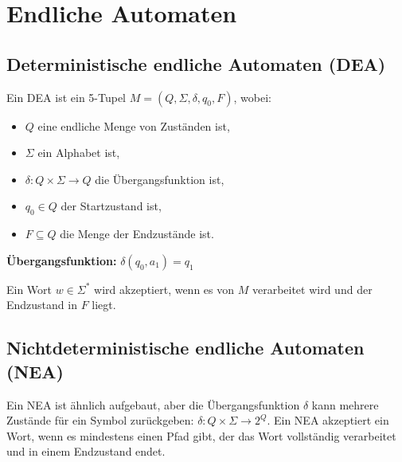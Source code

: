 \documentclass{article}
\begin{document}
\section*{Endliche Automaten}
\begin{minipage}[t]{0.45\textwidth}
    \subsection*{Deterministische endliche Automaten (DEA)}
    Ein DEA ist ein 5-Tupel $M = (Q, \Sigma, \delta, q_0, F)$, wobei:
    \begin{itemize}
        \item $Q$ eine endliche Menge von Zuständen ist,
        \item $\Sigma$ ein Alphabet ist,
        \item $\delta: Q \times \Sigma \to Q$ die Übergangsfunktion ist,
        \item $q_0 \in Q$ der Startzustand ist,
        \item $F \subseteq Q$ die Menge der Endzustände ist.
    \end{itemize}
    \textbf{Übergangsfunktion:} $\delta(q_0, a_1) = q_1$

    Ein Wort $w \in \Sigma^*$ wird akzeptiert, wenn es von $M$ verarbeitet wird und der Endzustand in $F$ liegt.
\end{minipage}
\hfill
\begin{minipage}[t]{0.45\textwidth}
    \subsection*{Nichtdeterministische endliche Automaten (NEA)}
    Ein NEA ist ähnlich aufgebaut, aber die Übergangsfunktion $\delta$ kann mehrere Zustände für ein Symbol zurückgeben: $\delta: Q \times \Sigma \to 2^Q$. Ein NEA akzeptiert ein Wort, wenn es mindestens einen Pfad gibt, der das Wort vollständig verarbeitet und in einem Endzustand endet.
\end{minipage}
\end{document}
